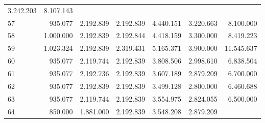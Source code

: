 \begin{tabular}{lllllll}
  \multicolumn{1}{r}{3.242.203} &
  \multicolumn{1}{r}{8.107.143} \\
\multicolumn{1}{l}{\hspace{1em}57} &
  \multicolumn{1}{|r}{935.077} &
  \multicolumn{1}{r}{2.192.839} &
  \multicolumn{1}{r}{2.192.839} &
  \multicolumn{1}{r}{4.440.151} &
  \multicolumn{1}{r}{3.220.663} &
  \multicolumn{1}{r}{8.100.000} \\
\multicolumn{1}{l}{\hspace{1em}58} &
  \multicolumn{1}{|r}{1.000.000} &
  \multicolumn{1}{r}{2.192.839} &
  \multicolumn{1}{r}{2.192.844} &
  \multicolumn{1}{r}{4.418.159} &
  \multicolumn{1}{r}{3.300.000} &
  \multicolumn{1}{r}{8.419.223} \\
\multicolumn{1}{l}{\hspace{1em}59} &
  \multicolumn{1}{|r}{1.023.324} &
  \multicolumn{1}{r}{2.192.839} &
  \multicolumn{1}{r}{2.319.431} &
  \multicolumn{1}{r}{5.165.371} &
  \multicolumn{1}{r}{3.900.000} &
  \multicolumn{1}{r}{11.545.637} \\
\multicolumn{1}{l}{\hspace{1em}60} &
  \multicolumn{1}{|r}{935.077} &
  \multicolumn{1}{r}{2.119.744} &
  \multicolumn{1}{r}{2.192.839} &
  \multicolumn{1}{r}{3.808.506} &
  \multicolumn{1}{r}{2.998.610} &
  \multicolumn{1}{r}{6.838.504} \\
\multicolumn{1}{l}{\hspace{1em}61} &
  \multicolumn{1}{|r}{935.077} &
  \multicolumn{1}{r}{2.192.736} &
  \multicolumn{1}{r}{2.192.839} &
  \multicolumn{1}{r}{3.607.189} &
  \multicolumn{1}{r}{2.879.209} &
  \multicolumn{1}{r}{6.700.000} \\
\multicolumn{1}{l}{\hspace{1em}62} &
  \multicolumn{1}{|r}{935.077} &
  \multicolumn{1}{r}{2.192.839} &
  \multicolumn{1}{r}{2.192.839} &
  \multicolumn{1}{r}{3.499.128} &
  \multicolumn{1}{r}{2.800.000} &
  \multicolumn{1}{r}{6.460.688} \\
\multicolumn{1}{l}{\hspace{1em}63} &
  \multicolumn{1}{|r}{935.077} &
  \multicolumn{1}{r}{2.119.744} &
  \multicolumn{1}{r}{2.192.839} &
  \multicolumn{1}{r}{3.554.975} &
  \multicolumn{1}{r}{2.824.055} &
  \multicolumn{1}{r}{6.500.000} \\
\multicolumn{1}{l}{\hspace{1em}64} &
  \multicolumn{1}{|r}{850.000} &
  \multicolumn{1}{r}{1.881.000} &
  \multicolumn{1}{r}{2.192.839} &
  \multicolumn{1}{r}{3.548.208} &
  \multicolumn{1}{r}{2.879.209} &

\end{tabular}
